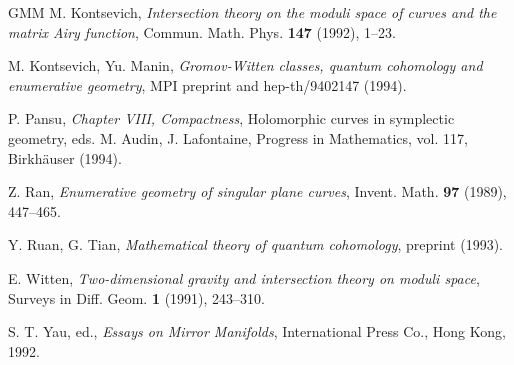 \documentclass{amsart}
\begin{document}
\begin{thebibliography}{GMM}
M. Kontsevich,
\textit{Intersection theory on the moduli space of curves and the matrix Airy function},
{Commun. Math. Phys.} \textbf{147} (1992), 1--23.


M. Kontsevich, Yu. Manin,
\textit{Gromov-Witten classes, quantum cohomology and enumerative geometry},
MPI preprint and hep-th/9402147 (1994).



P. Pansu,
\textit{Chapter VIII, Compactness},
Holomorphic curves in symplectic geometry,
eds. M. Audin, J. Lafontaine, Progress in Mathematics, vol. 117,
{Birkh\"auser} (1994).


Z. Ran,
\textit{Enumerative geometry of singular plane curves},
{Invent. Math.} \textbf{97} (1989), 447--465.


Y. Ruan, G. Tian,
\textit{Mathematical theory of quantum cohomology},
preprint (1993).



E. Witten,
\textit{Two-dimensional gravity and intersection theory on moduli space},
{Surveys in Diff. Geom.} \textbf{1} (1991), 243--310.


S. T. Yau, ed.,
\textit{Essays on Mirror Manifolds},
International  Press Co., Hong Kong, 1992.

\end{thebibliography}
\end{document}
